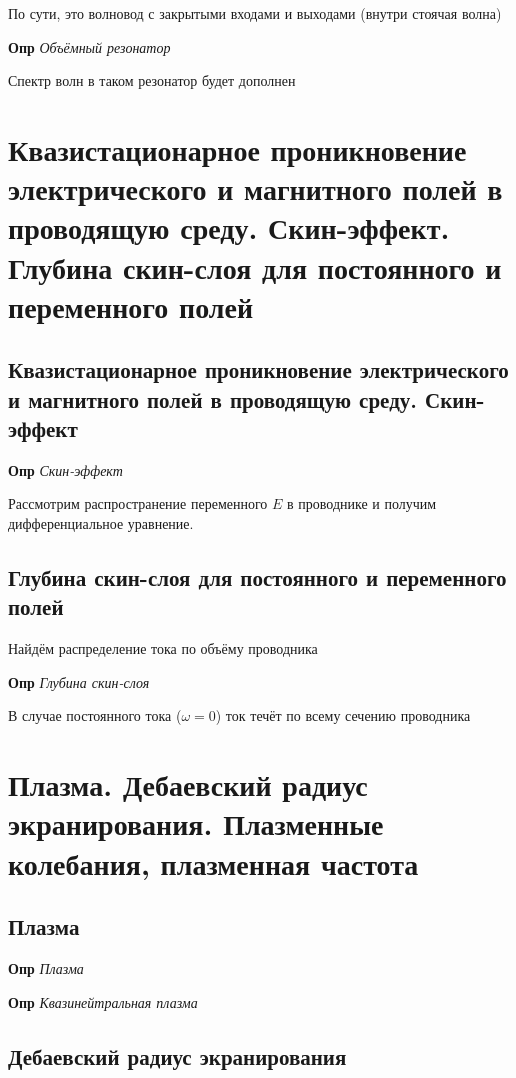 \documentclass[a4paper, 14pt]{article}
\begin{document}
    По сути, это волновод с закрытыми входами и выходами (внутри стоячая волна)
    
    \textbf{Опр} \textit{Объёмный резонатор}
    
    Спектр волн в таком резонатор будет дополнен
    
    \section{Квазистационарное проникновение электрического и магнитного полей в проводящую среду. Скин-эффект.
    Глубина скин-слоя для постоянного и переменного полей}
    
    \subsection{Квазистационарное проникновение электрического и магнитного полей в проводящую среду. Скин-эффект}
    
    \textbf{Опр} \textit{Скин-эффект}
    
    Рассмотрим распространение переменного $E$ в проводнике и получим дифференциальное уравнение.
    
    \subsection{Глубина скин-слоя для постоянного и переменного полей}
    
    Найдём распределение тока по объёму проводника
    
    \textbf{Опр} \textit{Глубина скин-слоя}
    
    В случае постоянного тока ($\omega = 0$) ток течёт по всему сечению проводника
    
    \section{Плазма.
    Дебаевский радиус экранирования.
    Плазменные колебания, плазменная частота}
    
    \subsection{Плазма}
    
    \textbf{Опр} \textit{Плазма}
    
    \textbf{Опр} \textit{Квазинейтральная плазма}
    
    \subsection{Дебаевский радиус экранирования}
    
\end{document}
